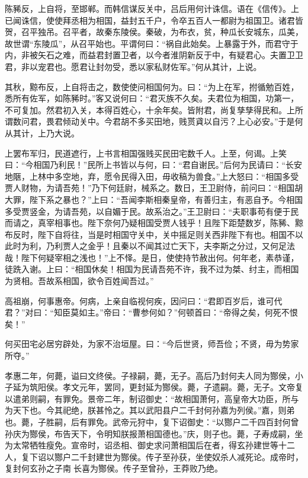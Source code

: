 \documentclass[12pt,UTF8]{ctexbook}
\begin{document}
陈豨反，上自将，至邯郸。而韩信谋反关中，吕后用何计诛信。语在《信传》。上已闻诛信，使使拜丞相为相国，益封五千户，令卒五百人一都尉为祖国卫。诸君皆贺，召平独吊。召平者，故秦东陵侯。秦破，为布衣，贫，种瓜长安城东，瓜美，故世谓“东陵瓜”，从召平始也。平谓何曰：“祸自此始矣。上暴露于外，而君守于内，非被矢石之难，而益君封置卫者，以今者淮阴新反于中，有疑君心。夫置卫卫君，非以宠君也。愿君让封勿受，悉以家私财佐军。”何从其计，上说。



其秋，黥布反，上自将击之，数使使问相国何为。曰：“为上在军，拊循勉百姓，悉所有佐军，如陈豨时。”客又说何曰：“君灭族不久矣。夫君位为相国，功第一，不可复加。然君初入关，本得百姓心，十余年矣。皆附君，尚复孳孳得民和。上所谓数问君，畏君倾动关中。今君胡不多买田地，贱贳貣以自污？上心必安。”于是何从其计，上乃大说。



上罢布军归，民道遮行，上书言相国强贱买民田宅数千人。上至，何谒。上笑曰：“今相国乃利民！”民所上书皆以与何，曰：“君自谢民。”后何为民请曰：“长安地陿，上林中多空地，弃，愿令民得入田，毋收稿为兽食。”上大怒曰：“相国多受贾人财物，为请吾苑！”乃下何廷尉，械系之。数日，王卫尉侍，前问曰：“相国胡大罪，陛下系之暴也？”上曰：“吾闻李斯相秦皇帝，有善归主，有恶自予。今相国多受贾竖金，为请吾苑，以自媚于民。故系治之。”王卫尉曰：“夫职事苟有便于民而请之，真宰相事也。陛下奈何乃疑相国受贾人钱乎！且陛下距楚数岁，陈豨、黥布反时，陛下自将往，当是时相国守关中，关中摇足则关西非陛下有也。相国不以此时为利，乃利贾人之金乎！且秦以不闻其过亡天下，夫李斯之分过，又何足法哉！陛下何疑宰相之浅也！”上不怿。是日，使使持节赦出何。何年老，素恭谨，徒跣入谢。上曰：“相国休矣！相国为民请吾苑不许，我不过为桀、纣主，而相国为贤相。吾故系相国，欲令百姓闻吾过。”



高祖崩，何事惠帝。何病，上亲自临视何疾，因问曰：“君即百岁后，谁可代君？”对曰：“知臣莫如主。”帝曰：“曹参何如？”何顿首曰：“帝得之矣，何死不恨矣！”



何买田宅必居穷辟处，为家不治垣屋。曰：“今后世贤，师吾俭；不贤，毋为势家所夺。”



孝惠二年，何薨，谥曰文终侯。子禄嗣，薨，无子。高后乃封何夫人同为酂侯，小子延为筑阳侯。孝文元年，罢同，更封延为酂侯。薨，子遗嗣。薨，无子。文帝复以遣弟则嗣，有罪免。景帝二年，制诏御史：“故相国萧何，高皇帝大功臣，所与为天下也。今其祀绝，朕甚怜之。其以武阳县户二千封何孙嘉为列侯。”嘉，则弟也。薨，子胜嗣，后有罪免。武帝元狩中，复下诏御史：“以酂户二千四百封何曾孙庆为酂侯，布告天下，令明知朕报萧相国德也。”庆，则子也。薨，子寿成嗣，坐为太常牺牲瘦免。宣帝时，诏丞相、御史求问萧相国后在者，得玄孙建世等十二人，复下诏以酂户二千封建世为酂侯。传子至孙获，坐使奴杀人减死论。成帝时，复封何玄孙之子南长喜为酂侯。传子至曾孙，王莽败乃绝。
\end{document}
